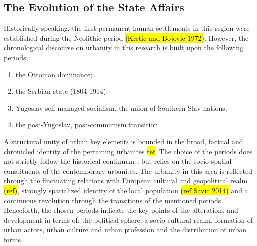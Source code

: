 \documentclass[11pt]{report}
\begin{document}
\subsection{The Evolution of the State Affairs}

Historically speaking, the first permanent human settlements in this region were established during the  Neolithic  period \hl{(Krstic and Bojovic 1972)}. However, the chronological discourse on urbanity in this research is built upon the following periods:
\begin{enumerate}
\item the Ottoman dominance;
\item the Serbian state (1804-1914); \footnotemark
\item Yugoslav self-managed socialism, the union of Southern Slav nations;
\item the post-Yugoslav, post-communism transition.
\end{enumerate}

A structural unity of urban key elements is bounded in the broad, factual and chronicled identity of the pertaining urbanites \hl{ref}. The choice of the periods does not strictly follow the historical continuum \footnotemark, but relies on the socio-spatial constituents of the contemporary urbanites. The urbanity in this area is reflected through the fluctuating relations with European cultural and geopolitical realm \hl{(ref)}, strongly spatialized identity of the local population \hl{(ref Savic 2014)} and a continuous revolution through the transitions of the mentioned periods. Henceforth, the chosen periods indicate the key points of the alterations and development in terms of: the political sphere, a socio-cultural realm, formation of urban actors, urban culture and urban profession and the distribution of urban forms.
\end{document}
